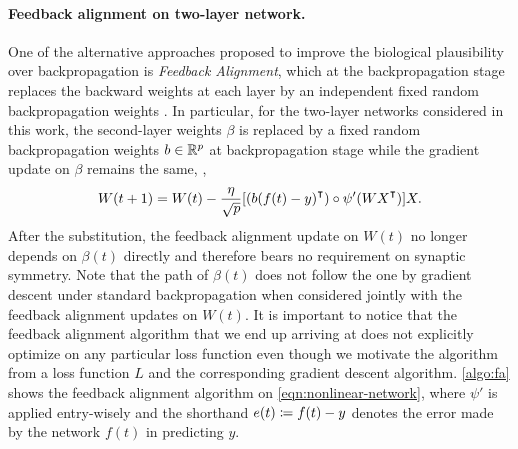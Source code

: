 \paragraph{Feedback alignment on two-layer network.}

One of the alternative approaches proposed to improve the biological plausibility over backpropagation is \emph{Feedback Alignment}, which at the backpropagation stage replaces the backward weights at each layer by an independent fixed random backpropagation weights \citep{lillicrap2016random}. In particular, for the two-layer networks considered in this work, the second-layer weights $\beta$ is replaced by a fixed random backpropagation weights $b\in{\mathbb{R}^{p}}$ at backpropagation stage while the gradient update on $\beta$ remains the same, \ie,
\begin{align}\label{eqn:alignment-update}
    W(t+1) = W(t) - \frac{\eta}{\sqrt{p}} [(b (f(t) - y)\transpose)\circ \psi'(WX\transpose)] X.
\end{align}
After the substitution, the feedback alignment update on $W(t)$ no longer depends on $\beta(t)$ directly and therefore bears no requirement on synaptic symmetry. Note that the path of $\beta(t)$ does not follow the one by gradient descent under standard backpropagation when considered jointly with the feedback alignment updates on $W(t)$. It is important to notice that the feedback alignment algorithm that we end up arriving at does not explicitly optimize on any particular loss function even though we motivate the algorithm from a loss function $L$ and the corresponding gradient descent algorithm.
\cref{algo:fa} shows the feedback alignment algorithm on \eqref{eqn:nonlinear-network}, where $\psi'$ is applied entry-wisely and the shorthand $e(t) \coloneqq f(t) -y$ denotes the error made by the network $f(t)$ in predicting $y$.

